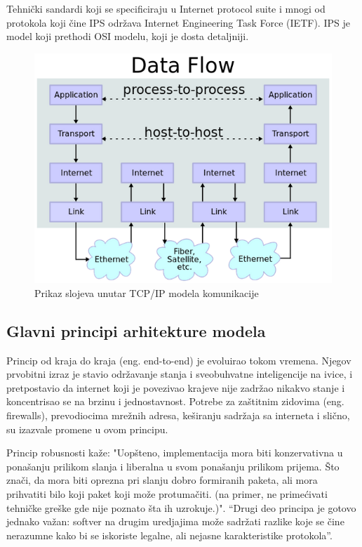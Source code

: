 \documentclass[a4paper,12pt, master]{etf}
\begin{document}
	Tehni\v{c}ki sandardi koji se specificiraju u Internet protocol suite i
    mnogi od protokola koji \v{c}ine IPS odr\v{z}ava Internet Engineering Task
    Force (IETF). IPS je model koji prethodi OSI modelu, koji je dosta
    detaljniji.

	\begin{figure}[htb]
			\centering
			\includegraphics[scale=.5]{../pic/tcpip_model.png}
			\caption{Prikaz slojeva unutar TCP/IP modela komunikacije}
			\label{fig:tcpip_model}
	\end{figure}

	\subsection{Glavni principi arhitekture modela}

    Princip od kraja do kraja (eng\@. end-to-end) je evoluirao tokom vremena. Njegov
    prvobitni izraz je stavio odr\v{z}avanje stanja i sveobuhvatne inteligencije
    na ivice,  i pretpostavio da internet koji je povezivao krajeve nije
    zadr\v{z}ao nikakvo stanje i koncentrisao se na brzinu i jednostavnost.
    Potrebe za za\v{s}titnim zidovima (eng\@. firewalls), prevodiocima
    mre\v{z}nih adresa, ke\v{s}iranju sadr\v{z}aja sa interneta i sli\v{c}no, su
    izazvale promene u ovom principu.

	Princip robusnosti ka\v{z}e: "Uop\v{s}teno, implementacija mora biti
	konzervativna u pona\v{s}anju prilikom slanja i liberalna u svom
	pona\v{s}anju prilikom prijema. \v{S}to zna\v{c}i, da mora biti
	oprezna pri slanju dobro formiranih paketa, ali mora prihvatiti bilo koji
    paket koji mo\v{z}e protuma\v{c}iti. (na primer, ne prime\'{c}ivati
    tehni\v{c}ke gre\v{s}ke gde nije poznato \v{s}ta ih uzrokuje.)". ``Drugi deo
    principa je gotovo jednako va\v{z}an: softver na drugim uredjajima mo\v{z}e
    sadr\v{z}ati razlike koje se \v{c}ine nerazumne kako bi se iskoriste
    legalne, ali nejasne karakteristike protokola''.
\end{document}
